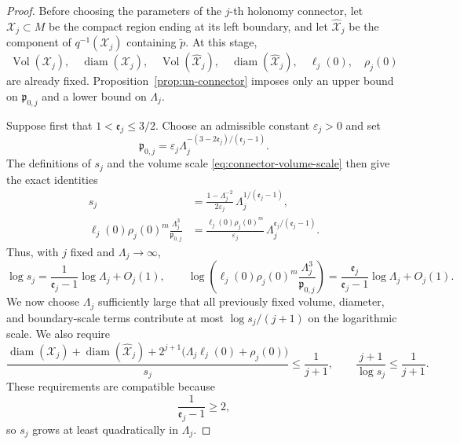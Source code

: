 \documentclass[11pt,reqno]{amsart}
\theoremstyle{definition}
\numberwithin{equation}{section}
\begin{document}
\begin{proof}
Before choosing the parameters of the \(j\)-th holonomy connector, let
\(\mathcal X_j\subset M\) be the compact region ending at its left
boundary, and let \(\widehat{\mathcal X}_j\) be the component of
\(q^{-1}(\mathcal X_j)\) containing
\(\widetilde p\).  At this stage,
\[
 \operatorname{Vol}(\mathcal X_j),\quad
 \operatorname{diam}(\mathcal X_j),\quad
 \operatorname{Vol}(\widehat{\mathcal X}_j),\quad
 \operatorname{diam}(\widehat{\mathcal X}_j),
 \quad \ell_j(0),\quad \rho_j(0)
\]
are already fixed.  Proposition~\ref{prop:un-connector} imposes only an
upper bound on \(\mathfrak p_{0,j}\) and a lower bound on \(\Lambda_j\).

Suppose first that \(1<\mathfrak e_j\le3/2\).  Choose an admissible
constant
\(\varepsilon_j>0\) and set
\[
 \mathfrak p_{0,j}
 =
 \varepsilon_j
 \Lambda_j^{-(3-2\mathfrak e_j)/(\mathfrak e_j-1)}.
 \tag{8.22}\label{eq:parameter-choice-q}
\]
The definitions of \(s_j\) and the volume scale
\eqref{eq:connector-volume-scale} then give the
exact identities
\[
 \begin{aligned}
 s_j
 &=
 \frac{1-\Lambda_j^{-2}}{2\varepsilon_j}\,
 \Lambda_j^{1/(\mathfrak e_j-1)},\\
 \ell_j(0)\rho_j(0)^m
 \frac{\Lambda_j^3}{\mathfrak p_{0,j}}
 &=
 \frac{\ell_j(0)\rho_j(0)^m}{\varepsilon_j}\,
 \Lambda_j^{\mathfrak e_j/(\mathfrak e_j-1)}.
 \end{aligned}
 \tag{8.23}\label{eq:parameter-scaling-q}
\]
Thus, with \(j\) fixed and \(\Lambda_j\to\infty\),
\[
 \log s_j
 =
 \frac{1}{\mathfrak e_j-1}\log\Lambda_j+O_j(1),
 \qquad
 \log\left(
 \ell_j(0)\rho_j(0)^m
 \frac{\Lambda_j^3}{\mathfrak p_{0,j}}
 \right)
 =
 \frac{\mathfrak e_j}{\mathfrak e_j-1}\log\Lambda_j+O_j(1).
\]
We now choose \(\Lambda_j\) sufficiently large that all previously fixed
volume, diameter, and boundary-scale terms contribute at most
\(\log s_j/(j+1)\) on the logarithmic scale.  We also require
\[
 \frac{
 \operatorname{diam}(\mathcal X_j)
 +\operatorname{diam}(\widehat{\mathcal X}_j)
 +2^{j+1}\bigl(\Lambda_j\ell_j(0)+\rho_j(0)\bigr)}
 {s_j}
 \le\frac1{j+1},
 \qquad
 \frac{j+1}{\log s_j}\le\frac1{j+1}.
 \tag{8.24}\label{eq:scale-separation}
\]
These requirements are compatible because
\[
 \frac{1}{\mathfrak e_j-1}\ge2,
\]
so \(s_j\) grows at least quadratically in \(\Lambda_j\).


\end{proof}
\end{document}
